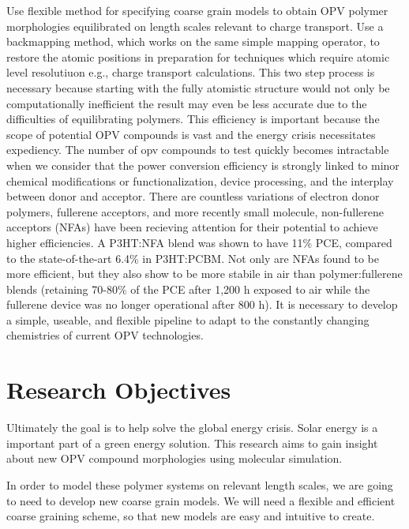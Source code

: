Use flexible method for specifying coarse grain models to obtain OPV polymer morphologies equilibrated on length scales relevant to charge transport.
Use a backmapping method, which works on the same simple mapping operator, to restore the atomic positions in preparation for techniques which require atomic level resolutiuon e.g., charge transport calculations.
This two step process is necessary because starting with the fully atomistic structure would not only be computationally inefficient the result may even be less accurate due to the difficulties of equilibrating polymers. \cite{Gartner2019}
This efficiency is important because the scope of potential OPV compounds is vast and the energy crisis necessitates expediency.
The number of opv compounds to test quickly becomes intractable when we consider that the power conversion efficiency is strongly linked to minor chemical modifications or functionalization, device processing, and the interplay between donor and acceptor\cite{Mazzio2015,Swick2019a}.
There are countless variations of electron donor polymers, fullerene acceptors, and more recently small molecule, non-fullerene acceptors (NFAs) have been recieving attention for their potential to achieve higher efficiencies\cite{Dou2013}.
A P3HT:NFA blend was shown to have 11\% PCE, compared to the state-of-the-art 6.4\% in P3HT:PCBM\cite{Baran2017}.
Not only are NFAs found to be more efficient, but they also show to be more stabile in air than polymer:fullerene blends (retaining 70-80\% of the PCE after 1,200 h exposed to air while the fullerene device was no longer operational after 800 h)\cite{Baran2017}.
It is necessary to develop a simple, useable, and flexible pipeline to adapt to the constantly changing chemistries of current OPV technologies. %

\section*{Research Objectives}

Ultimately the goal is to help solve the global energy crisis. 
Solar energy is a important part of a green energy solution.
This research aims to gain insight about new OPV compound morphologies using molecular simulation.

In order to model these polymer systems on relevant length scales, we are going to need to develop new coarse grain models.
We will need a flexible and efficient coarse graining scheme, so that new models are easy and intuitive to create.

